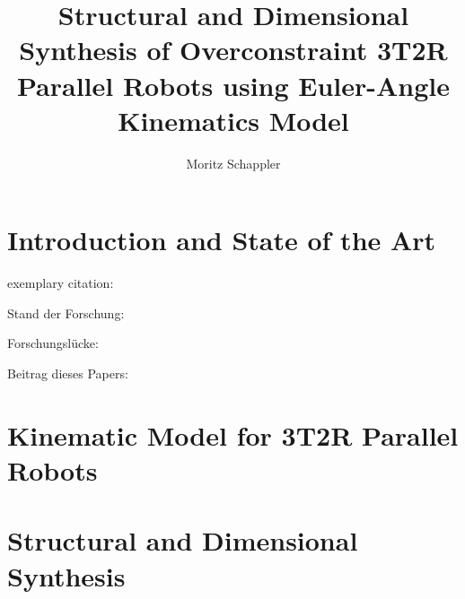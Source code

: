 \documentclass[graybox]{svmult}
\begin{document}
\title*{Structural and Dimensional Synthesis of Overconstraint 3T2R Parallel Robots using Euler-Angle Kinematics Model}
\author{Moritz Schappler}


\maketitle



\section{Introduction and State of the Art}
\label{sec:introduction}

exemplary citation: \cite{SchapplerTapOrt2019}


Stand der Forschung:
\begin{compactitem}
\item 
\end{compactitem}



Forschungslücke:
\begin{compactitem}
\item 
\end{compactitem}


Beitrag dieses Papers:
\begin{compactitem}
\item 
\end{compactitem}

\section{Kinematic Model for 3T2R Parallel Robots}

\begin{compactitem}
\item 
\end{compactitem}



\section{Structural and Dimensional Synthesis}
\end{document}
